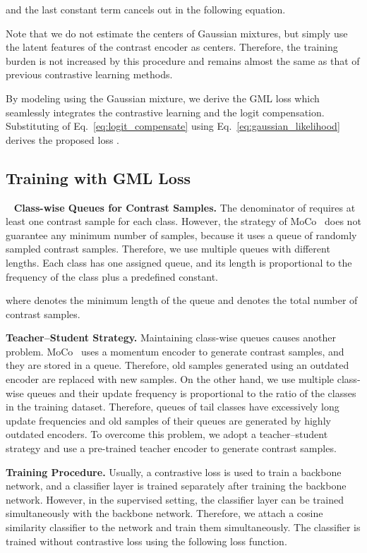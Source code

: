 \documentclass{article}
\theoremstyle{plain}
\theoremstyle{definition}
\theoremstyle{remark}
\begin{document}
and the last constant term cancels out in the following equation.

Note that we do not estimate the centers of Gaussian mixtures, but simply use the latent features of the contrast encoder as centers. Therefore, the training burden is not increased by this procedure and remains almost the same as that of previous contrastive learning methods.

By modeling  using the Gaussian mixture, we derive the GML loss which seamlessly integrates the contrastive learning and the logit compensation.
Substituting  of Eq.~\ref{eq:logit_compensate} using Eq.~\ref{eq:gaussian_likelihood} derives the proposed loss .


\subsection{Training with GML Loss}~\label{sec:training_gml}
\textbf{Class-wise Queues for Contrast Samples.} The denominator of  requires at least one contrast sample for each class. However, the strategy of MoCo~\cite{he2020momentum} does not guarantee any minimum number of samples, because it uses a queue of randomly sampled contrast samples. Therefore, we use multiple queues with different lengths. Each class has one assigned queue, and its length is proportional to the frequency of the class plus a predefined constant.

where  denotes the minimum length of the queue and  denotes the total number of contrast samples.

\textbf{Teacher--Student Strategy.} Maintaining class-wise queues causes another problem. MoCo~\cite{he2020momentum} uses a momentum encoder to generate contrast samples, and they are stored in a queue. Therefore, old samples generated using an outdated encoder are replaced with new samples. On the other hand, we use multiple class-wise queues and their update frequency is proportional to the ratio of the classes in the training dataset. Therefore, queues of tail classes have excessively long update frequencies and old samples of their queues are generated by highly outdated encoders. To overcome this problem, we adopt a teacher--student strategy and use a pre-trained teacher encoder to generate contrast samples.

\textbf{Training Procedure.} Usually, a contrastive loss is used to train a backbone network, and a classifier layer is trained separately after training the backbone network. However, in the supervised setting, the classifier layer can be trained simultaneously with the backbone network. Therefore, we attach a cosine similarity classifier to the network and train them simultaneously. The classifier is trained without contrastive loss using the following loss function.
\end{document}
